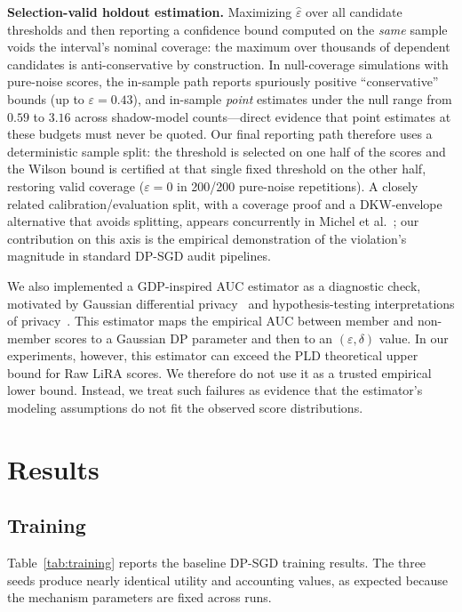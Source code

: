 \documentclass{article}
\begin{document}
\textbf{Selection-valid holdout estimation.} Maximizing $\hat{\varepsilon}$ over all candidate thresholds and then reporting a confidence bound computed on the \emph{same} sample voids the interval's nominal coverage: the maximum over thousands of dependent candidates is anti-conservative by construction. In null-coverage simulations with pure-noise scores, the in-sample path reports spuriously positive ``conservative'' bounds (up to $\varepsilon = 0.43$), and in-sample \emph{point} estimates under the null range from $0.59$ to $3.16$ across shadow-model counts---direct evidence that point estimates at these budgets must never be quoted. Our final reporting path therefore uses a deterministic sample split: the threshold is selected on one half of the scores and the Wilson bound is certified at that single fixed threshold on the other half, restoring valid coverage ($\varepsilon = 0$ in 200/200 pure-noise repetitions). A closely related calibration/evaluation split, with a coverage proof and a DKW-envelope alternative that avoids splitting, appears concurrently in Michel et al.~\citep{michel2026sequential}; our contribution on this axis is the empirical demonstration of the violation's magnitude in standard DP-SGD audit pipelines.

We also implemented a GDP-inspired AUC estimator as a diagnostic check, motivated by Gaussian differential privacy~\citep{dong2019gaussian} and hypothesis-testing interpretations of privacy~\citep{balle2020hypothesis}. This estimator maps the empirical AUC between member and non-member scores to a Gaussian DP parameter and then to an $(\varepsilon,\delta)$ value. In our experiments, however, this estimator can exceed the PLD theoretical upper bound for Raw LiRA scores. We therefore do not use it as a trusted empirical lower bound. Instead, we treat such failures as evidence that the estimator's modeling assumptions do not fit the observed score distributions.

\section{Results}

\subsection{Training}

Table~\ref{tab:training} reports the baseline DP-SGD training results. The three seeds produce nearly identical utility and accounting values, as expected because the mechanism parameters are fixed across runs.
\end{document}
